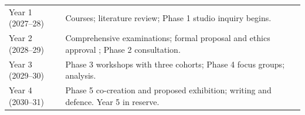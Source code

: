 \documentclass[letterpaper,11pt]{article}
\begin{document}
\begin{center}
\small
\begin{tabularx}{\linewidth}{@{}lX@{}}
\toprule
Year 1 (2027--28) & Courses; literature review; Phase 1 studio inquiry begins. \\
Year 2 (2028--29) & Comprehensive examinations; formal proposal and ethics approval \citep{york_dissregs}; Phase 2 consultation. \\
Year 3 (2029--30) & Phase 3 workshops with three cohorts; Phase 4 focus groups; analysis. \\
Year 4 (2030--31) & Phase 5 co-creation and proposed exhibition; writing and defence. Year 5 in reserve. \\
\bottomrule
\end{tabularx}
\end{center}



\end{document}
